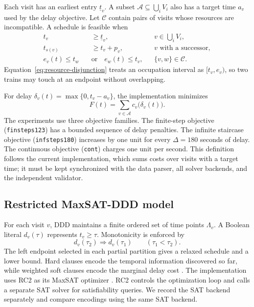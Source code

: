 \documentclass[preprint,12pt,authoryear]{elsarticle}
\begin{document}
Each visit has an earliest entry $\underline t_v$. A subset
$\mathcal A\subseteq \bigcup_i V_i$ also has a target time $a_v$ used by the
delay objective. Let $\mathcal C$ contain pairs of visits whose resources are
incompatible. A schedule is feasible when
\begin{align}
t_v &\ge \underline t_v,
&& v\in \bigcup_i V_i, \label{eq:earliest}\\
t_{s(v)} &\ge t_v+p_v,
&& v\text{ with a successor}, \label{eq:route-precedence}\\
e_v(t)\le t_w\quad &\text{or}\quad e_w(t)\le t_v,
&& \{v,w\}\in\mathcal C. \label{eq:resource-disjunction}
\end{align}
Equation~\eqref{eq:resource-disjunction} treats an occupation interval as
$[t_v,e_v)$, so two trains may touch at an endpoint without overlapping.

For delay $\delta_v(t)=\max\{0,t_v-a_v\}$, the implementation minimizes
\begin{equation}
F(t)=\sum_{v\in\mathcal A} c_v\bigl(\delta_v(t)\bigr).
\label{eq:objective}
\end{equation}
The experiments use three objective families. The finite-step objective
(\texttt{finsteps123}) has a bounded sequence of delay penalties. The infinite
staircase objective (\texttt{infsteps180}) increases by one unit for every
$\Delta=180$ seconds of delay. The continuous objective (\texttt{cont}) charges
one unit per second. This definition follows the current implementation, which
sums costs over visits with a target time; it must be kept synchronized with the
data parser, all solver backends, and the independent validator.

\subsection{Restricted MaxSAT-DDD model}

For each visit $v$, DDD maintains a finite ordered set of time points
$\Lambda_v$. A Boolean literal $d_v(\tau)$ represents $t_v\ge\tau$. Monotonicity
is enforced by
\begin{equation}
d_v(\tau_2)\Rightarrow d_v(\tau_1)
\qquad(\tau_1<\tau_2).
\label{eq:ladder}
\end{equation}
The left endpoint selected in each partial partition gives a relaxed schedule
and a lower bound. Hard clauses encode the temporal information discovered so
far, while weighted soft clauses encode the marginal delay cost
\citep{Croella2024,LiManya2021}. The implementation uses RC2 as its MaxSAT
optimizer \citep{Ignatiev2019}. RC2 controls the optimization loop and calls a
separate SAT solver for satisfiability queries. We record the SAT backend
separately and compare encodings using the same SAT backend.
\end{document}
